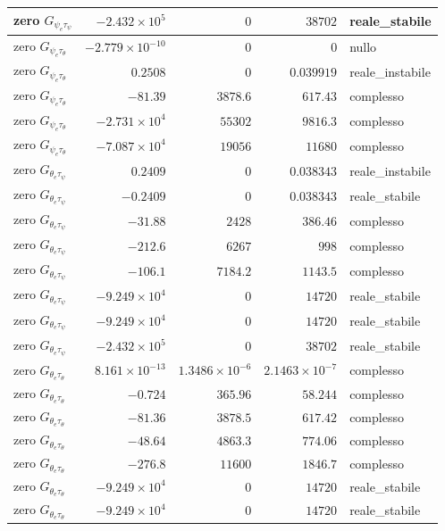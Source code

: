 \documentclass[10pt,a4paper]{article}
\numberwithin{equation}{section}
\begin{document}
\begin{longtable}{lrrrl}
zero $G_{\psi_e\tau_\psi}$ & $-2.432\times10^{5}$ & $0$ & $38702$ & reale\_stabile \\
\midrule
zero $G_{\psi_e\tau_\theta}$ & $-2.779\times10^{-10}$ & $0$ & $0$ & nullo \\
zero $G_{\psi_e\tau_\theta}$ & $0.2508$ & $0$ & $0.039919$ & reale\_instabile \\
zero $G_{\psi_e\tau_\theta}$ & $-81.39$ & $3878.6$ & $617.43$ & complesso \\
zero $G_{\psi_e\tau_\theta}$ & $-2.731\times10^{4}$ & $55302$ & $9816.3$ & complesso \\
zero $G_{\psi_e\tau_\theta}$ & $-7.087\times10^{4}$ & $19056$ & $11680$ & complesso \\
\midrule
zero $G_{\theta_e\tau_\psi}$ & $0.2409$ & $0$ & $0.038343$ & reale\_instabile \\
zero $G_{\theta_e\tau_\psi}$ & $-0.2409$ & $0$ & $0.038343$ & reale\_stabile \\
zero $G_{\theta_e\tau_\psi}$ & $-31.88$ & $2428$ & $386.46$ & complesso \\
zero $G_{\theta_e\tau_\psi}$ & $-212.6$ & $6267$ & $998$ & complesso \\
zero $G_{\theta_e\tau_\psi}$ & $-106.1$ & $7184.2$ & $1143.5$ & complesso \\
zero $G_{\theta_e\tau_\psi}$ & $-9.249\times10^{4}$ & $0$ & $14720$ & reale\_stabile \\
zero $G_{\theta_e\tau_\psi}$ & $-9.249\times10^{4}$ & $0$ & $14720$ & reale\_stabile \\
zero $G_{\theta_e\tau_\psi}$ & $-2.432\times10^{5}$ & $0$ & $38702$ & reale\_stabile \\
\midrule
zero $G_{\theta_e\tau_\theta}$ & $8.161\times10^{-13}$ & $1.3486\times10^{-6}$ & $2.1463\times10^{-7}$ & complesso \\
zero $G_{\theta_e\tau_\theta}$ & $-0.724$ & $365.96$ & $58.244$ & complesso \\
zero $G_{\theta_e\tau_\theta}$ & $-81.36$ & $3878.5$ & $617.42$ & complesso \\
zero $G_{\theta_e\tau_\theta}$ & $-48.64$ & $4863.3$ & $774.06$ & complesso \\
zero $G_{\theta_e\tau_\theta}$ & $-276.8$ & $11600$ & $1846.7$ & complesso \\
zero $G_{\theta_e\tau_\theta}$ & $-9.249\times10^{4}$ & $0$ & $14720$ & reale\_stabile \\
zero $G_{\theta_e\tau_\theta}$ & $-9.249\times10^{4}$ & $0$ & $14720$ & reale\_stabile \\
\bottomrule\end{longtable}
\end{document}
